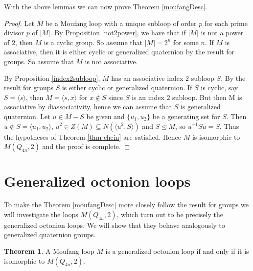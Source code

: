 \documentclass[12pt, twoside, openright]{report}
\theoremstyle{definition}
\newtheorem{thm}{Theorem}[chapter]
\begin{document}
With the above lemmas we can now prove Theorem \ref{moufangDesc}.

\begin{proof}
	Let $M$ be a Moufang loop with a unique subloop of order $p$ for each prime divisor $p$ of $|M|$.
    By Proposition \ref{not2power}, we have that if $|M|$ is not a power of $2$, then $M$ is a cyclic group.
    So assume that $|M| = 2^n$ for some $n$. If $M$ is associative, then it is either cyclic or generalized
    quaternion by the result for groups. So assume that $M$ is not associative.

    By Proposition \ref{index2subloop}, $M$ has an associative index $2$ subloop $S$. By the result for
      groups $S$ is either cyclic or generalized quaternion. If $S$ is cyclic, say $S = \langle s\rangle$,
      then $M = \langle s, x\rangle$ for $x\notin S$ since $S$ is an index $2$ subloop. But then M is
      associative by diassociativity, hence we can assume that $S$ is generalized quaternion. Let
      $u\in M- S$ be given and $\{u_1, u_2\}$ be a generating set for $S$. Then
      $u\notin S = \langle u_1, u_2\rangle$, $u^2 \in Z(M) \subseteq N(\langle u^2, S\rangle)$ and $S\unlhd M$,
      so $u^{-1}Su = S$. Thus the hypotheses of Theorem \ref{thm-chein} are satisfied. Hence $M$ is isomorphic
      to $M(Q_{4n}, 2)$ and the proof is complete.
\end{proof}


\section{Generalized octonion loops}

To make the Theorem \ref{moufangDesc} more closely follow the result for groups we will investigate the
  loops $M(Q_{4n}, 2)$, which turn out to be precisely the generalized octonion loops. We will show that
  they behave analogously to generalized quaternion groups.

\begin{thm}\label{doubling}
    A Moufang loop $M$ is a generalized octonion loop if and only if it is isomorphic to $M(Q_{4n}, 2)$.
\end{thm}
\end{document}
